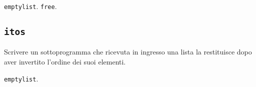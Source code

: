 
\begin{tags}
\texttt{emptylist}. \texttt{free}.
\end{tags}


\subsection{\texttt{itos}}
Scrivere un sottoprogramma che ricevuta in ingresso una lista la restituisce dopo aver invertito l'ordine dei suoi elementi.


\begin{tags}
\texttt{emptylist}. 
\end{tags}
 